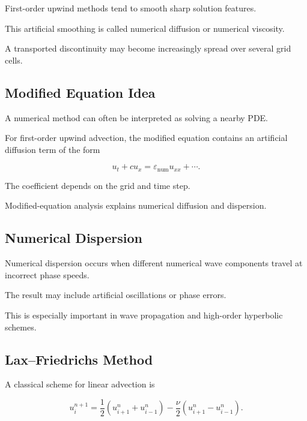 First-order upwind methods tend to smooth sharp solution features.

This artificial smoothing is called numerical diffusion or numerical
viscosity.

A transported discontinuity may become increasingly spread over several
grid cells.

\subsection{Modified Equation Idea}
\label{subsec:modified-equation}

A numerical method can often be interpreted as solving a nearby PDE.

For first-order upwind advection, the modified equation contains an
artificial diffusion term of the form

\[
\boxed{
u_t
+
cu_x
=
\varepsilon_{\mathrm{num}}u_{xx}
+
\cdots.
}
\]

The coefficient depends on the grid and time step.

Modified-equation analysis explains numerical diffusion and dispersion.

\subsection{Numerical Dispersion}
\label{subsec:numerical-dispersion}

Numerical dispersion occurs when different numerical wave components travel
at incorrect phase speeds.

The result may include artificial oscillations or phase errors.

This is especially important in wave propagation and high-order
hyperbolic schemes.

\subsection{Lax--Friedrichs Method}
\label{subsec:lax-friedrichs}

A classical scheme for linear advection is

\[
\boxed{
u_i^{n+1}
=
\frac12
\left(
u_{i+1}^n
+
u_{i-1}^n
\right)
-
\frac{\nu}{2}
\left(
u_{i+1}^n
-
u_{i-1}^n
\right).
}
\]

